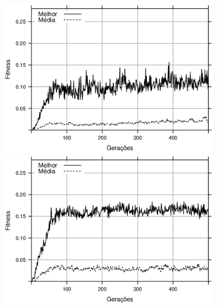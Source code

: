 \begin{figure}[h]
    \centering
    \begin{minipage}{.5\textwidth}
        \includegraphics[width=\textwidth]{figures/fitness-f1}
    \end{minipage}%
    \begin{minipage}{.5\textwidth}
        \includegraphics[width=\textwidth]{figures/fitness-f2}
    \end{minipage}


\end{figure}
